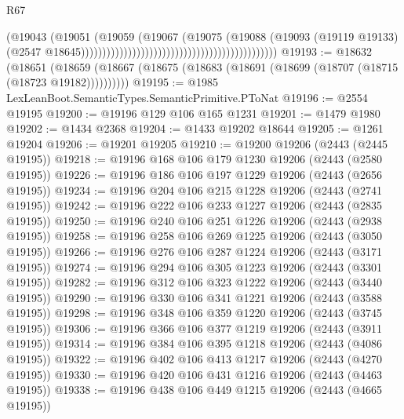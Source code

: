 \begin{lexlean}{R67}
\begin{coremodule}
                                                                                (@19043
                                                                                  (@19051
                                                                                    (@19059
                                                                                      (@19067
                                                                                        (@19075
                                                                                          (@19088
                                                                                            (@19093
                                                                                              (@19119
                                                                                                @19133)
                                                                                              (@2547
                                                                                                @18645))))))))))))))))))))))))))))))))))))))))))))))
@19193 := @18632
    (@18651 (@18659 (@18667 (@18675 (@18683 (@18691 (@18699 (@18707 (@18715 (@18723 @19182))))))))))
@19195 := @1985 LexLeanBoot.SemanticTypes.SemanticPrimitive.PToNat
@19196 := @2554 @19195
@19200 := @19196 @129 @106 @165 @1231
@19201 := @1479 @1980
@19202 := @1434 @2368
@19204 := @1433 @19202 @18644
@19205 := @1261 @19204
@19206 := @19201 @19205
@19210 := @19200 @19206 (@2443 (@2445 @19195))
@19218 := @19196 @168 @106 @179 @1230 @19206 (@2443 (@2580 @19195))
@19226 := @19196 @186 @106 @197 @1229 @19206 (@2443 (@2656 @19195))
@19234 := @19196 @204 @106 @215 @1228 @19206 (@2443 (@2741 @19195))
@19242 := @19196 @222 @106 @233 @1227 @19206 (@2443 (@2835 @19195))
@19250 := @19196 @240 @106 @251 @1226 @19206 (@2443 (@2938 @19195))
@19258 := @19196 @258 @106 @269 @1225 @19206 (@2443 (@3050 @19195))
@19266 := @19196 @276 @106 @287 @1224 @19206 (@2443 (@3171 @19195))
@19274 := @19196 @294 @106 @305 @1223 @19206 (@2443 (@3301 @19195))
@19282 := @19196 @312 @106 @323 @1222 @19206 (@2443 (@3440 @19195))
@19290 := @19196 @330 @106 @341 @1221 @19206 (@2443 (@3588 @19195))
@19298 := @19196 @348 @106 @359 @1220 @19206 (@2443 (@3745 @19195))
@19306 := @19196 @366 @106 @377 @1219 @19206 (@2443 (@3911 @19195))
@19314 := @19196 @384 @106 @395 @1218 @19206 (@2443 (@4086 @19195))
@19322 := @19196 @402 @106 @413 @1217 @19206 (@2443 (@4270 @19195))
@19330 := @19196 @420 @106 @431 @1216 @19206 (@2443 (@4463 @19195))
@19338 := @19196 @438 @106 @449 @1215 @19206 (@2443 (@4665 @19195))

\end{coremodule}
\end{lexlean}
